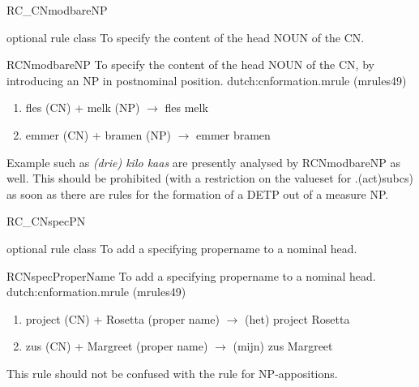 \begin{mruleclass}{RC\_CNmodbareNP}
\begin{classdescr}
\kind optional rule class
\classtask To specify the content of the head NOUN of the CN.
\classremarks

\nofilters

\nospeedrules

\noplannedrules

\norulesnotince


\end{classdescr}

\begin{members}


\begin{member}
 RCNmodbareNP
 To specify the content of the head NOUN of the CN, by
introducing an NP in postnominal position.
\file dutch:cnformation.mrule (mrules49)
\semantics \nosemantics
\example\mbox{}
\begin{enumerate}
  \item 
 fles (CN) + melk (NP) $\rightarrow$ fles melk
  \item
 emmer (CN) + bramen (NP) $\rightarrow$  emmer bramen
\end{enumerate}
\remarks\mbox{}
Example such as {\em (drie) kilo kaas} are presently analysed by RCNmodbareNP 
as well. 
This should be prohibited (with a restriction on the valueset for 
.(act)subcs) as soon as there are rules for the formation of a 
DETP out of a measure NP. 
\end{member}
\end{members}
\end{mruleclass}
\begin{mruleclass}{RC\_CNspecPN}
\begin{classdescr}
\kind optional rule class
\classtask To add a specifying propername to a nominal head.
\classremarks

\nofilters

\nospeedrules

\noplannedrules

\norulesnotince


\end{classdescr}

\begin{members}


\begin{member}
 RCNspecProperName
 To add a specifying propername to a nominal head.
\file dutch:cnformation.mrule (mrules49)
\semantics \nosemantics
\example \mbox{}
\begin{enumerate}
  \item 
project (CN) + Rosetta (proper name) $\rightarrow$ 
(het) project Rosetta
  \item
zus (CN) + Margreet (proper name) $\rightarrow$ 
(mijn) zus Margreet
\end{enumerate}
\remarks\mbox{}
This rule should not be confused with the rule for NP-appositions.
\end{member}
\end{members}

\end{mruleclass}
